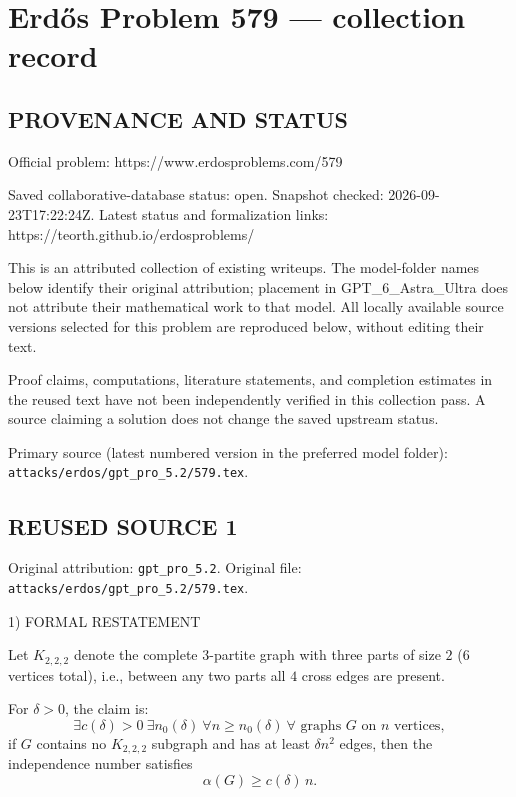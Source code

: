 \section*{Erd\H{o}s Problem 579 --- collection record}

\subsection*{PROVENANCE AND STATUS}
Official problem: https://www.erdosproblems.com/579

Saved collaborative-database status: open.
Snapshot checked: 2026-09-23T17:22:24Z.
Latest status and formalization links: https://teorth.github.io/erdosproblems/

This is an attributed collection of existing writeups. The model-folder names below identify their original attribution; placement in GPT\_6\_Astra\_Ultra does not attribute their mathematical work to that model. All locally available source versions selected for this problem are reproduced below, without editing their text.

Proof claims, computations, literature statements, and completion estimates in the reused text have not been independently verified in this collection pass. A source claiming a solution does not change the saved upstream status.

Primary source (latest numbered version in the preferred model folder): \texttt{attacks/erdos/gpt\_pro\_5.2/579.tex}.

\subsection*{REUSED SOURCE 1}
Original attribution: \texttt{gpt\_pro\_5.2}.
Original file: \texttt{attacks/erdos/gpt\_pro\_5.2/579.tex}.


1) FORMAL RESTATEMENT

Let $K_{2,2,2}$ denote the complete $3$-partite graph with three parts of size $2$ (6 vertices total), i.e., between any two parts all $4$ cross edges are present.

For $\delta>0$, the claim is:
\[
\exists c(\delta)>0\ \exists n_0(\delta)\ \forall n\ge n_0(\delta)\ \forall\text{ graphs }G\text{ on }n\text{ vertices},
\]
if $G$ contains no $K_{2,2,2}$ subgraph and has at least $\delta n^2$ edges, then the independence number satisfies
\[
\alpha(G)\ge c(\delta)\,n.
\]

